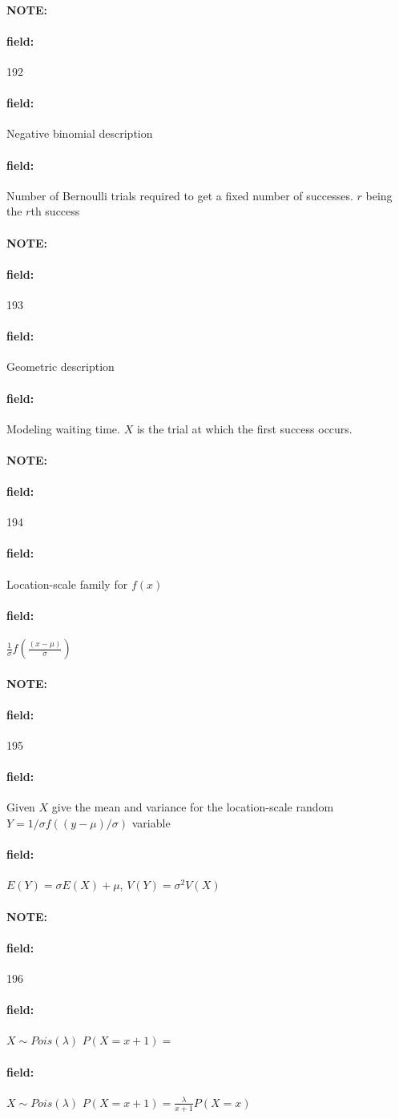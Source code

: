 \documentclass[12pt]{article}
\newenvironment{note}{\paragraph{NOTE:}}{}
\newenvironment{field}{\paragraph{field:}}{}
\begin{document}
\begin{note} \begin{field} \tiny 192 \end{field}
  \begin{field}
    Negative binomial description
  \end{field}
  \begin{field}
    Number of Bernoulli trials required to get a fixed number of successes. $r$ being the $r$th success
  \end{field}
\end{note}

\begin{note} \begin{field} \tiny 193 \end{field}
  \begin{field}
    Geometric description
  \end{field}
  \begin{field}
    Modeling waiting time. $X$ is the trial at which the first success occurs.
  \end{field}
\end{note}

\begin{note} \begin{field} \tiny 194 \end{field}
  \begin{field}
    Location-scale family for $f(x)$
  \end{field}
  \begin{field}
    $ \frac{1}{\sigma} f(\frac{(x - \mu)}{\sigma})$
  \end{field}
\end{note}

\begin{note} \begin{field} \tiny 195 \end{field}
  \begin{field}
    Given $X$ give the mean and variance for the location-scale random $Y= 1/\sigma f((y - \mu)/\sigma)$ variable
  \end{field}
  \begin{field}
    $E(Y) = \sigma E(X) + \mu$, $V(Y) = \sigma^2 V(X)$
  \end{field}
\end{note}


\begin{note} \begin{field} \tiny 196 \end{field}
  \begin{field}
    $X \sim Pois(\lambda)$ $P(X = x+1) = $
  \end{field}
  \begin{field}
    $X \sim Pois(\lambda)$ $P(X = x+1) = \frac{\lambda}{x + 1}P(X = x)$
  \end{field}
\end{note}
\end{document}
